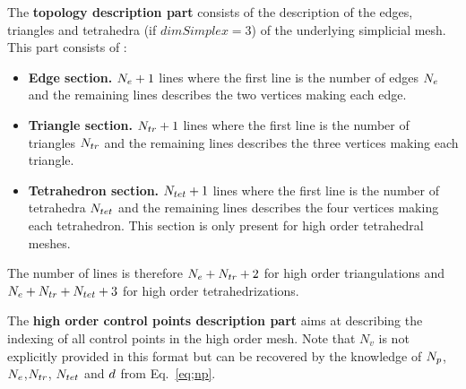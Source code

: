 \documentclass[a4paper,11pt]{article}
\begin{document}
The {\bf topology description part} consists of the description of the edges, triangles and tetrahedra (if $dimSimplex=3$) of the underlying simplicial mesh. This part consists of  : 
\begin{itemize}
\item {\bf Edge section.} ${ N_e}+1$ lines where the first line is the number of edges ${ N_e}$ and the remaining lines describes the two vertices making each edge.
\item {\bf Triangle section.} ${N_{tr}}+1$ lines where the first line is the number of triangles ${N_{tr}}$ and the remaining lines describes the three vertices making each triangle.
\item {\bf Tetrahedron section.} ${N_{tet}}+1$ lines where the first line is the number of tetrahedra ${N_{tet}}$ and the remaining lines describes the four vertices making each tetrahedron. This section is only present for high order tetrahedral meshes.
\end{itemize}
The number of lines is therefore ${ N_e}+{N_{tr}}+2$ for high order triangulations and ${ N_e}+{N_{tr}}+{N_{tet}}+3$ for  high order tetrahedrizations.

The {\bf high order control points description part} aims at describing the indexing of all control points in the high order mesh. Note that $N_{v}$ is not explicitly provided in this format but can be recovered by the knowledge of ${N_{p}}$, ${ N_e}$,${N_{tr}}$, ${N_{tet}}$ and ${d}$ from Eq.~\ref{eq;np}.
\end{document}

